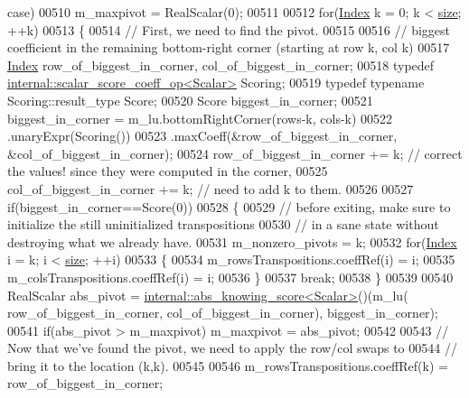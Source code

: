 \begin{DoxyCode}
{       case)}
00510   m\_maxpivot = RealScalar(0);
00511 
00512   \textcolor{keywordflow}{for}(\hyperlink{group___core___module_a554f30542cc2316add4b1ea0a492ff02}{Index} k = 0; k < \hyperlink{group___core___module_ac2c9348df3bb9c0044dbae6c278a8977}{size}; ++k)
00513   \{
00514     \textcolor{comment}{// First, we need to find the pivot.}
00515 
00516     \textcolor{comment}{// biggest coefficient in the remaining bottom-right corner (starting at row k, col k)}
00517     \hyperlink{group___core___module_a554f30542cc2316add4b1ea0a492ff02}{Index} row\_of\_biggest\_in\_corner, col\_of\_biggest\_in\_corner;
00518     \textcolor{keyword}{typedef} \hyperlink{struct_eigen_1_1internal_1_1scalar__score__coeff__op}{internal::scalar\_score\_coeff\_op<Scalar>} Scoring;
00519     \textcolor{keyword}{typedef} \textcolor{keyword}{typename} Scoring::result\_type Score;
00520     Score biggest\_in\_corner;
00521     biggest\_in\_corner = m\_lu.bottomRightCorner(rows-k, cols-k)
00522                         .unaryExpr(Scoring())
00523                         .maxCoeff(&row\_of\_biggest\_in\_corner, &col\_of\_biggest\_in\_corner);
00524     row\_of\_biggest\_in\_corner += k; \textcolor{comment}{// correct the values! since they were computed in the corner,}
00525     col\_of\_biggest\_in\_corner += k; \textcolor{comment}{// need to add k to them.}
00526 
00527     \textcolor{keywordflow}{if}(biggest\_in\_corner==Score(0))
00528     \{
00529       \textcolor{comment}{// before exiting, make sure to initialize the still uninitialized transpositions}
00530       \textcolor{comment}{// in a sane state without destroying what we already have.}
00531       m\_nonzero\_pivots = k;
00532       \textcolor{keywordflow}{for}(\hyperlink{group___core___module_a554f30542cc2316add4b1ea0a492ff02}{Index} i = k; i < \hyperlink{group___core___module_ac2c9348df3bb9c0044dbae6c278a8977}{size}; ++i)
00533       \{
00534         m\_rowsTranspositions.coeffRef(i) = i;
00535         m\_colsTranspositions.coeffRef(i) = i;
00536       \}
00537       \textcolor{keywordflow}{break};
00538     \}
00539 
00540     RealScalar abs\_pivot = \hyperlink{struct_eigen_1_1internal_1_1abs__knowing__score}{internal::abs\_knowing\_score<Scalar>}()(m\_lu(
      row\_of\_biggest\_in\_corner, col\_of\_biggest\_in\_corner), biggest\_in\_corner);
00541     \textcolor{keywordflow}{if}(abs\_pivot > m\_maxpivot) m\_maxpivot = abs\_pivot;
00542 
00543     \textcolor{comment}{// Now that we've found the pivot, we need to apply the row/col swaps to}
00544     \textcolor{comment}{// bring it to the location (k,k).}
00545 
00546     m\_rowsTranspositions.coeffRef(k) = row\_of\_biggest\_in\_corner;

\end{DoxyCode}
